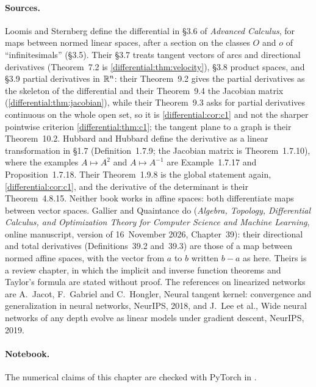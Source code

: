 \begin{notechapter}
\paragraph{Sources.} Loomis and Sternberg define the differential in
\S3.6 of \emph{Advanced Calculus}, for maps between normed linear spaces,
after a section on the classes $O$ and $o$ of ``infinitesimals'' (\S3.5).
Their \S3.7 treats tangent vectors of arcs and directional derivatives
(Theorem~7.2 is \cref{differential:thm:velocity}), \S3.8 product spaces,
and \S3.9 partial derivatives in $\mathbb{R}^n$: their Theorem~9.2 gives the
partial derivatives as the skeleton of the differential and their
Theorem~9.4 the Jacobian matrix
(\cref{differential:thm:jacobian}), while their Theorem~9.3 asks for
partial derivatives continuous on the whole open set, so it is
\cref{differential:cor:c1} and not the sharper pointwise criterion
\cref{differential:thm:c1}; the tangent
plane to a graph is their Theorem~10.2. Hubbard and Hubbard define the
derivative as a linear transformation in \S1.7 (Definition~1.7.9; the
Jacobian matrix is Theorem~1.7.10), where the examples $A\mapsto A^2$ and
$A\mapsto A^{-1}$ are Example~1.7.17 and Proposition~1.7.18. Their
Theorem~1.9.8 is the global statement again,
\cref{differential:cor:c1}, and the derivative of the
determinant is their Theorem~4.8.15. Neither book works in affine
spaces: both differentiate maps between vector spaces. Gallier and
Quaintance do (\emph{Algebra, Topology, Differential Calculus, and
Optimization Theory for Computer Science and Machine Learning}, online
manuscript, version of 16~November 2026, Chapter~39): their directional
and total derivatives (Definitions~39.2 and~39.3) are those of a map
between normed affine spaces, with the vector from $a$ to $b$ written
$b - a$ as here. Theirs is a review chapter, in which the implicit and
inverse function theorems and Taylor's formula are stated without proof.
The references on
linearized networks are A.~Jacot, F.~Gabriel and C.~Hongler, Neural
tangent kernel: convergence and generalization in neural networks,
NeurIPS, 2018, and J.~Lee et al., Wide neural networks of any depth
evolve as linear models under gradient descent, NeurIPS, 2019.

\paragraph{Notebook.} The numerical claims of this chapter are checked
with PyTorch in .


\end{notechapter}
